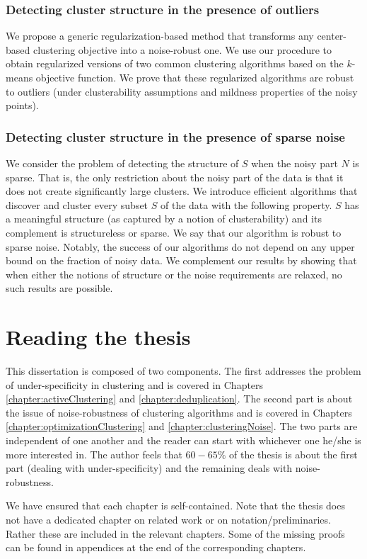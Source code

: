 \documentclass[12pt]{article}
\begin{document}
\subsubsection*{Detecting cluster structure in the presence of outliers}
We propose a generic regularization-based method that transforms any center-based clustering objective into a noise-robust one. We use our procedure to obtain regularized versions of two common clustering algorithms based on the $k$-means objective function. We prove that these regularized algorithms are robust to outliers (under clusterability assumptions and mildness properties of the noisy points).


\subsubsection*{Detecting cluster structure in the presence of sparse noise}
We consider the problem of detecting the structure of $S$ when the noisy part $N$ is sparse. That is, the only restriction about the noisy part of the data is that it does not create significantly large clusters. We introduce efficient algorithms that discover and cluster every subset $S$ of the data with the following property. $S$ has a meaningful structure (as captured by a notion of clusterability) and its complement is structureless or sparse. We say that our algorithm is robust to sparse noise. Notably, the success of our algorithms do not depend on any upper bound on the fraction of noisy data. We complement our results by showing that when either the notions of structure or the noise requirements are relaxed, no such results are possible.

\section{Reading the thesis}
This dissertation is composed of two components. The first addresses the problem of under-specificity in clustering and is covered in Chapters \ref{chapter:activeClustering} and \ref{chapter:deduplication}. The second part is about the issue of noise-robustness of clustering algorithms and is covered in Chapters \ref{chapter:optimizationClustering} and \ref{chapter:clusteringNoise}. The two parts are independent of one another and the reader can start with whichever one he/she is more interested in. The author feels that $60-65\%$ of the thesis is about the first part (dealing with under-specificity) and the remaining deals with noise-robustness. 

We have ensured that each chapter is self-contained. Note that the thesis does not have a dedicated chapter on related work or on notation/preliminaries. Rather these are included in the relevant chapters. Some of the missing proofs can be found in appendices at the end of the corresponding chapters.
  
\ifdefined\COMPLETE
\else
\end{document}
